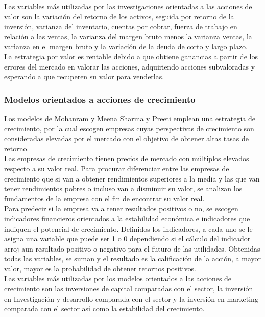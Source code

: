 Las variables más utilizadas por las investigaciones orientadas a las acciones de valor son la variación del retorno de los activos, seguida por retorno de la inversión, varianza del inventario, cuentas por cobrar, fuerza de trabajo en relación a las ventas, la varianza del margen bruto menos la varianza ventas, la varianza en el margen bruto y la variación de la deuda de corto y largo plazo.\\

La estrategia por valor es rentable debido a que obtiene ganancias a partir de los errores del mercado en valorar las acciones, adquiriendo acciones subvaloradas y esperando a que recuperen su valor para venderlas.\\

\subsubsection{Modelos orientados a acciones de crecimiento}
	
Los modelos de Mohanram \cite{Mohanram2005} y Meena Sharma y Preeti \cite{Preeti2009} emplean una estrategia de crecimiento, por la cual escogen empresas cuyas perspectivas de crecimiento son consideradas elevadas por el mercado con el objetivo de obtener altas tasas de retorno.\\

Las empresas de crecimiento tienen precios de mercado con m\'ultiplos elevados respecto a su valor real. Para procurar diferenciar entre las empresas de crecimiento que si van a obtener rendimientos superiores a la media y las que van tener rendimientos pobres o incluso van a disminuir su valor, se analizan los fundamentos de la empresa con el fin de encontrar su valor real.\\

Para predecir si la empresa va a tener resultados positivos o no, se escogen indicadores financieros orientados a la estabilidad econ\'omica e indicadores que indiquen el potencial de crecimiento. Definidos los indicadores, a cada uno se le asigna una variable que puede ser 1 o 0 dependiendo si el cálculo del indicador arroj aun resultado positivo o negativo para el futuro de las utilidades. Obtenidas todas las variables, se suman y el resultado es la calificación de la acción, a mayor valor, mayor es la probabilidad de obtener retornos positivos.\\

Las variables más utilizadas por los modelos orientados a las acciones de crecimiento son las inversiones de capital comparadas con el sector,  la inversión en Investigación y desarrollo comparada con el sector y la inversión en marketing comparada con el sector así como la estabilidad del crecimiento.\\

